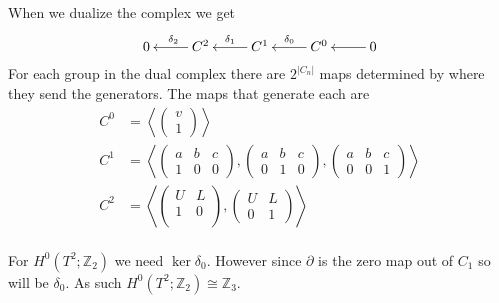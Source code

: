 \documentclass[10pt]{article}
\newcommand{\bb}[1]{\mathbb{#1}}
\theoremstyle{plain}
\theoremstyle{remark}
\begin{document}
When we dualize the complex we get
\[
  \xymatrix{
    0 & \ar[l]_{\delta_2} C^2 & \ar[l]_{\delta_1} C^1 & \ar[l]_{\delta_0} C^0 & \ar[l] 0
  }
\]
For each group in the dual complex there are $2^{|C_n|}$ maps determined
by where they send the generators. The maps that generate each are
\begin{align*}
  C^0 &=
       \left\langle
       \left(
       \begin{array}{c}
         v\\
         1
       \end{array}
  \right)
  \right\rangle\\
  C^1 &=
       \left\langle
       \left(
       \begin{array}{ccc}
         a & b & c\\
         1 & 0 & 0
       \end{array}
                 \right),
                 \left(
                 \begin{array}{ccc}
                   a & b & c\\
                   0 & 1 & 0
                 \end{array}
                           \right),
                           \left(
                           \begin{array}{ccc}
                             a & b & c\\
                             0 & 0 & 1
                           \end{array}
                                     \right)
                                     \right\rangle\\
  C^2 &=
       \left\langle
       \left(
       \begin{array}{cc}
         U & L\\
         1 & 0\\
       \end{array}
  \right),
  \left(
  \begin{array}{cc}
    U & L\\
    0 & 1
  \end{array}
        \right)
        \right\rangle\\
\end{align*}

For $H^0(T^2;\bb{Z}_2)$ we need $\ker\delta_0$. However since $\partial$ is the zero map
out of $C_1$ so will be $\delta_0$. As such $H^0(T^2;\bb{Z}_2)\cong\bb{Z}_3$.
\end{document}
